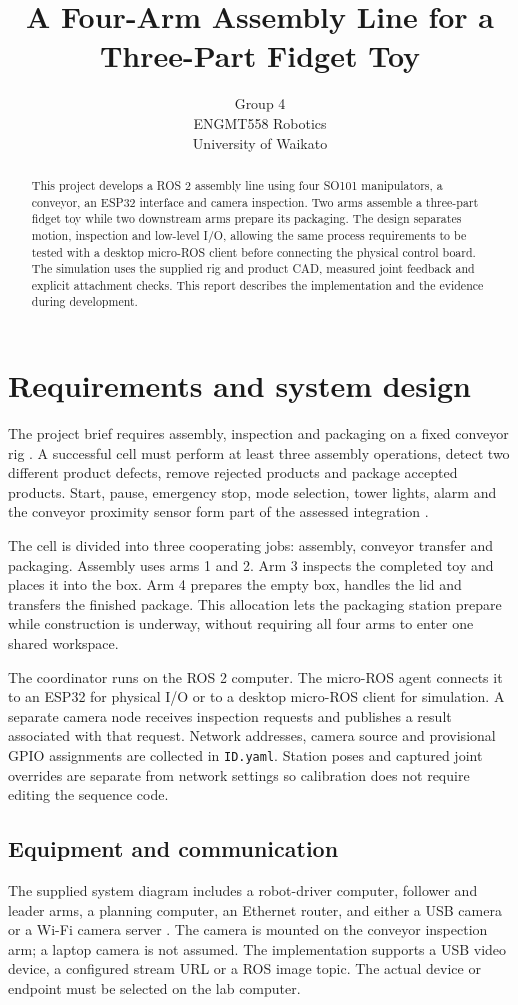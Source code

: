 \documentclass{article}
\title{A Four-Arm Assembly Line for a Three-Part Fidget Toy}
\author{Group 4 \\ ENGMT558 Robotics \\ University of Waikato}
\begin{document}
\maketitle
\begin{abstract}
This project develops a ROS 2 assembly line using four SO101 manipulators, a conveyor, an ESP32 interface and camera inspection. Two arms assemble a three-part fidget toy while two downstream arms prepare its packaging. The design separates motion, inspection and low-level I/O, allowing the same process requirements to be tested with a desktop micro-ROS client before connecting the physical control board. The simulation uses the supplied rig and product CAD, measured joint feedback and explicit attachment checks. This report describes the implementation and the evidence during development. 
\end{abstract}

\section{Requirements and system design}
The project brief requires assembly, inspection and packaging on a fixed conveyor rig \cite{brief}. A successful cell must perform at least three assembly operations, detect two different product defects, remove rejected products and package accepted products. Start, pause, emergency stop, mode selection, tower lights, alarm and the conveyor proximity sensor form part of the assessed integration \cite{rubric}.

The cell is divided into three cooperating jobs: assembly, conveyor transfer and packaging. Assembly uses arms 1 and 2. Arm 3 inspects the completed toy and places it into the box. Arm 4 prepares the empty box, handles the lid and transfers the finished package. This allocation lets the packaging station prepare while construction is underway, without requiring all four arms to enter one shared workspace.

The coordinator runs on the ROS 2 computer. The micro-ROS agent connects it to an ESP32 for physical I/O or to a desktop micro-ROS client for simulation. A separate camera node receives inspection requests and publishes a result associated with that request. Network addresses, camera source and provisional GPIO assignments are collected in \texttt{ID.yaml}. Station poses and captured joint overrides are separate from network settings so calibration does not require editing the sequence code.

\subsection{Equipment and communication}
The supplied system diagram includes a robot-driver computer, follower and leader arms, a planning computer, an Ethernet router, and either a USB camera or a Wi-Fi camera server \cite{diagram}. The camera is mounted on the conveyor inspection arm; a laptop camera is not assumed. The implementation supports a USB video device, a configured stream URL or a ROS image topic. The actual device or endpoint must be selected on the lab computer.
\end{document}
